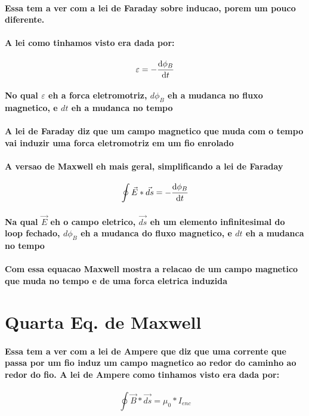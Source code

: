 \documentclass[12pt,twoside, a4paper, twocolumn]{article}
\begin{document}
\paragraph*{Essa tem a ver com a lei de Faraday sobre inducao, porem um pouco diferente.}
\paragraph*{A lei como tinhamos visto era dada por:}
\begin{equation}
    \varepsilon = - \frac{\mathrm d \phi_B}{\mathrm d t}
\end{equation}
\paragraph*{No qual $\varepsilon$ eh a forca eletromotriz, $d\phi_B$ eh a mudanca no fluxo magnetico, e $dt$ eh a mudanca no tempo}
\paragraph*{A lei de Faraday diz que um campo magnetico que muda com o tempo vai induzir uma forca eletromotriz em um fio enrolado}
\paragraph*{A versao de Maxwell eh mais geral, simplificando a lei de Faraday}
\begin{equation}
    \oint \vec{E} * \vec{ds} = - \frac{\mathrm d \phi_B}{\mathrm d t}
\end{equation}
\paragraph*{Na qual $\vec{E}$ eh o campo eletrico, $\vec{ds}$ eh um elemento infinitesimal do loop fechado, $d\phi_B$ eh a mudanca do fluxo magnetico, e $dt$ eh a mudanca no tempo}
\paragraph*{Com essa equacao Maxwell mostra a relacao de um campo magnetico que muda no tempo e de uma forca eletrica induzida}

\section{Quarta Eq. de Maxwell}
\paragraph*{Essa tem a ver com a lei de Ampere que diz que uma corrente que passa por um fio induz um campo magnetico ao redor do caminho ao redor do fio. A lei de Ampere como tinhamos visto era dada por:}
\begin{equation}
    \oint \vec{B} * \vec{ds} = \mu_0 * I_{enc}
\end{equation}
\end{document}
